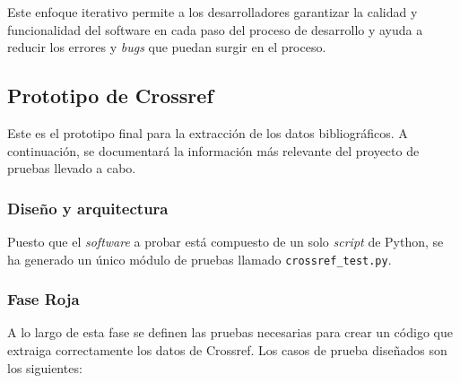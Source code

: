  Este enfoque iterativo permite a los desarrolladores garantizar la calidad y funcionalidad del software en cada paso del proceso de desarrollo y ayuda a reducir los errores y \textit{bugs} que puedan surgir en el proceso. 


\subsection{Prototipo de Crossref}
Este es el prototipo final para la extracción de los datos bibliográficos. A continuación, se documentará la información más relevante del proyecto de pruebas llevado a cabo.

\subsubsection{Diseño y arquitectura}
Puesto que el \textit{software} a probar está compuesto de un solo \textit{script} de Python, se ha generado un único módulo de pruebas llamado \texttt{crossref\_test.py}. 

\subsubsection{Fase Roja}
A lo largo de esta fase se definen las pruebas necesarias para crear un código que extraiga correctamente los datos de Crossref. Los casos de prueba diseñados son los siguientes:

